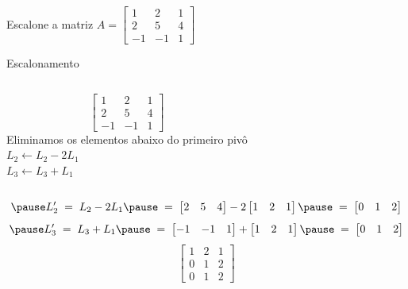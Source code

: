 \begin{question}
Escalone a matriz
\(
  A =
  \begin{bmatrix}
    1  & 2  & 1 \\
    2  & 5  & 4 \\
    -1 & -1 & 1
  \end{bmatrix}
\)
\end{question}

\begin{resolution}{Escalonamento}
\begin{columns}
  \[
  \begin{bmatrix}
    1  & 2  & 1 \\
    2  & 5  & 4 \\
    -1 & -1 & 1
  \end{bmatrix}
  \]
  \pause
{}
  Eliminamos os elementos abaixo do primeiro pivô
  \\ \pause
  \(
    L_2 \leftarrow L_2 - 2 L_1
  \)
  \\ \pause
  \(
    L_3 \leftarrow L_3 + L_1
  \)
\end{columns}
\vspace{-\baselineskip}
\[
  \pause
  L'_2
  \;=\;
  L_2 - 2 L_1
  \pause
  \;=\;
  \begin{bmatrix}
    2  & 5  & 4
  \end{bmatrix}
  - 2
  \begin{bmatrix}
    1  & 2  & 1
  \end{bmatrix}
  \pause
  \;=\;
  \begin{bmatrix}
    0 & 1 & 2
  \end{bmatrix}
\]
\[
  \pause
  L'_3
  \;=\;
  L_3 + L_1
  \pause
  \;=\;
  \begin{bmatrix}
    -1 & -1 & 1
  \end{bmatrix}
  +
  \begin{bmatrix}
    1  & 2  & 1
  \end{bmatrix}
  \pause
  \;=\;
  \begin{bmatrix}
    0 & 1 & 2
  \end{bmatrix}
\]
\pause
\[
  \begin{bmatrix}
    1 & 2 & 1 \\
    0 & 1 & 2 \\
    0 & 1 & 2
  \end{bmatrix}
\]
\end{resolution}

